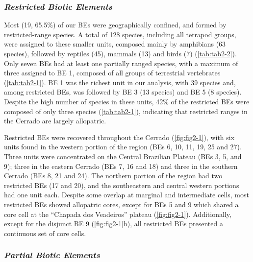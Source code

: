 \documentclass[12pt,openright,oneside,a4paper,english]{abntex2}
\begin{document}
\subsubsection{\textit{Restricted Biotic Elements}}

Most (19, 65.5\%) of our BEs were geographically confined, and formed by restricted-range species. A total of 128 species, including all tetrapod groups, were assigned to these smaller units, composed mainly by amphibians (63 species), followed by reptiles (45), mammals (13) and birds (7) (\autoref{tab:tab2-2}). Only seven BEs had at least one partially ranged species, with a maximum of three assigned to BE 1, composed of all groups of terrestrial vertebrates (\autoref{tab:tab2-1}). BE 1 was the richest unit in our analysis, with 39 species and, among restricted BEs, was followed by BE 3 (13 species) and BE 5 (8 species). Despite the high number of species in these units, 42\% of the restricted BEs were composed of only three species (\autoref{tab:tab2-1}), indicating that restricted ranges in the Cerrado are largely allopatric.

Restricted BEs were recovered throughout the Cerrado (\autoref{fig:fig2-1}), with six units found in the western portion of the region (BEs 6, 10, 11, 19, 25 and 27). Three units were concentrated on the Central Brazilian Plateau (BEs 3, 5, and 9); three in the eastern Cerrado (BEs 7, 16 and 18) and three in the southern Cerrado (BEs 8, 21 and 24). The northern portion of the region had two restricted BEs (17 and 20), and the southeastern and central western portions had one unit each. Despite some overlap at marginal and intermediate cells, most restricted BEs showed allopatric cores, except for BEs 5 and 9 which shared a core cell at the “Chapada dos Veadeiros” plateau (\autoref{fig:fig2-1}). Additionally, except for the disjunct BE 9 (\autoref{fig:fig2-1}b), all restricted BEs presented a continuous set of core cells.

\subsubsection{\textit{Partial Biotic Elements}}
\end{document}
